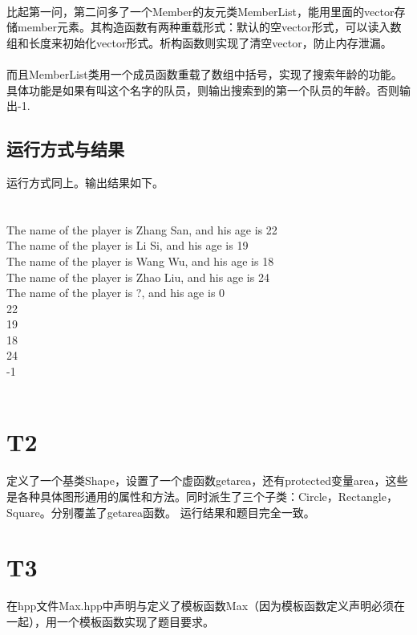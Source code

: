 \documentclass{article}
\begin{document}
\begin{CJK}{UTF8}{gkai}
\paragraph{} 比起第一问，第二问多了一个Member的友元类MemberList，能用里面的vector存储member元素。其构造函数有两种重载形式：默认的空vector形式，可以读入数组和长度来初始化vector形式。析构函数则实现了清空vector，防止内存泄漏。
\paragraph{} 而且MemberList类用一个成员函数重载了数组中括号，实现了搜索年龄的功能。具体功能是如果有叫这个名字的队员，则输出搜索到的第一个队员的年龄。否则输出-1.
\subsection{运行方式与结果}运行方式同上。输出结果如下。\\
\\
\\
The name of the player is Zhang San, and his age is 22\\
The name of the player is Li Si, and his age is 19\\
The name of the player is Wang Wu, and his age is 18\\
The name of the player is Zhao Liu, and his age is 24\\
The name of the player is ?, and his age is 0\\
22\\
19\\
18\\
24\\
-1\\
\\
\section{T2}定义了一个基类Shape，设置了一个虚函数getarea，还有protected变量area，这些是各种具体图形通用的属性和方法。同时派生了三个子类：Circle，Rectangle，Square。分别覆盖了getarea函数。 运行结果和题目完全一致。
\section{T3}在hpp文件Max.hpp中声明与定义了模板函数Max（因为模板函数定义声明必须在一起），用一个模板函数实现了题目要求。
\end{CJK}
\end{document}
